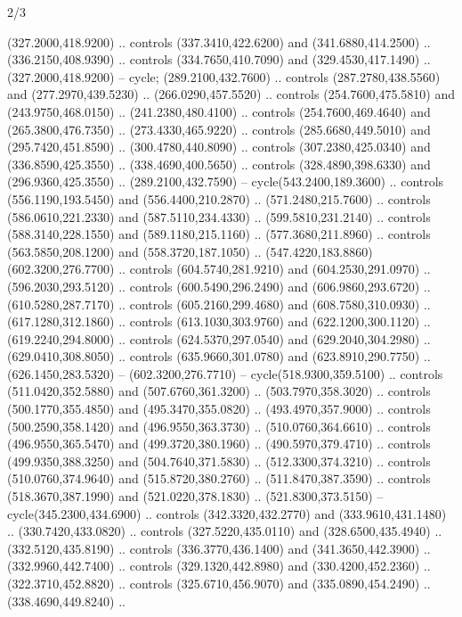 \begin{flagdescription}{2/3}
\begin{scope}[xshift=0.5\flaglength,yshift=0.5\flagwidth,scale=\flagwidth/255]
\begin{scope}[y=-0.43pt, x=0.43pt,xshift=-193pt,yshift=133pt]
\begin{scope}[draw=black,line width=0.003\flagwidth]
\begin{scope}[fill=white]
 (327.2000,418.9200) .. controls (337.3410,422.6200) and
  (341.6880,414.2500) .. (336.2150,408.9390) .. controls (334.7650,410.7090) and
  (329.4530,417.1490) .. (327.2000,418.9200) -- cycle;
 (289.2100,432.7600) .. controls (287.2780,438.5560) and
  (277.2970,439.5230) .. (266.0290,457.5520) .. controls (254.7600,475.5810) and
  (243.9750,468.0150) .. (241.2380,480.4100) .. controls (254.7600,469.4640) and
  (265.3800,476.7350) .. (273.4330,465.9220) .. controls (285.6680,449.5010) and
  (295.7420,451.8590) .. (300.4780,440.8090) .. controls (307.2380,425.0340) and
  (336.8590,425.3550) .. (338.4690,400.5650) .. controls (328.4890,398.6330) and
  (296.9360,425.3550) .. (289.2100,432.7590) -- cycle(543.2400,189.3600) ..
  controls (556.1190,193.5450) and (556.4400,210.2870) .. (571.2480,215.7600) ..
  controls (586.0610,221.2330) and (587.5110,234.4330) .. (599.5810,231.2140) ..
  controls (588.3140,228.1550) and (589.1180,215.1160) .. (577.3680,211.8960) ..
  controls (563.5850,208.1200) and (558.3720,187.1050) ..
  (547.4220,183.8860)(602.3200,276.7700) .. controls (604.5740,281.9210) and
  (604.2530,291.0970) .. (596.2030,293.5120) .. controls (600.5490,296.2490) and
  (606.9860,293.6720) .. (610.5280,287.7170) .. controls (605.2160,299.4680) and
  (608.7580,310.0930) .. (617.1280,312.1860) .. controls (613.1030,303.9760) and
  (622.1200,300.1120) .. (619.2240,294.8000) .. controls (624.5370,297.0540) and
  (629.2040,304.2980) .. (629.0410,308.8050) .. controls (635.9660,301.0780) and
  (623.8910,290.7750) .. (626.1450,283.5320) -- (602.3200,276.7710) --
  cycle(518.9300,359.5100) .. controls (511.0420,352.5880) and
  (507.6760,361.3200) .. (503.7970,358.3020) .. controls (500.1770,355.4850) and
  (495.3470,355.0820) .. (493.4970,357.9000) .. controls (500.2590,358.1420) and
  (496.9550,363.3730) .. (510.0760,364.6610) .. controls (496.9550,365.5470) and
  (499.3720,380.1960) .. (490.5970,379.4710) .. controls (499.9350,388.3250) and
  (504.7640,371.5830) .. (512.3300,374.3210) .. controls (510.0760,374.9640) and
  (515.8720,380.2760) .. (511.8470,387.3590) .. controls (518.3670,387.1990) and
  (521.0220,378.1830) .. (521.8300,373.5150) -- cycle(345.2300,434.6900) ..
  controls (342.3320,432.2770) and (333.9610,431.1480) .. (330.7420,433.0820) ..
  controls (327.5220,435.0110) and (328.6500,435.4940) .. (332.5120,435.8190) ..
  controls (336.3770,436.1400) and (341.3650,442.3900) .. (332.9960,442.7400) ..
  controls (329.1320,442.8980) and (330.4200,452.2360) .. (322.3710,452.8820) ..
  controls (325.6710,456.9070) and (335.0890,454.2490) .. (338.4690,449.8240) ..

\end{scope}
\end{scope}
\end{scope}
\end{scope}
\end{flagdescription}
